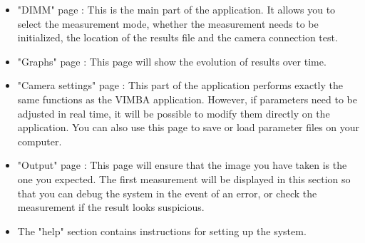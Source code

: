 \begin{itemize}
    \item "DIMM" page : This is the main part of the application. It allows you to select the measurement mode,
          whether the measurement needs to be initialized, the location of the results file and the camera connection test.
    \item "Graphs" page : This page will show the evolution of results over time.
    \item "Camera settings" page : This part of the application performs exactly the same functions as the VIMBA application.
          However, if parameters need to be adjusted in real time, it will be possible to modify them directly on the application.
          You can also use this page to save or load parameter files on your computer.
    \item "Output" page : This page will ensure that the image you have taken is the one you expected.
          The first measurement will be displayed in this section so that you can debug the system in the event of an error,
          or check the measurement if the result looks suspicious.
    \item The "help" section contains instructions for setting up the system.
\end{itemize}